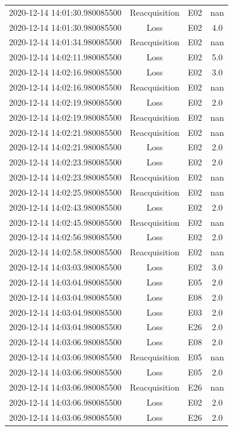 \begin{enumerate}
\begin{longtabu}{cccc}
2020{-}12{-}14 14:01:30.980085500&Reacquisition&E02&nan\\%
2020{-}12{-}14 14:01:30.980085500&Loss&E02&4.0\\%
2020{-}12{-}14 14:01:34.980085500&Reacquisition&E02&nan\\%
2020{-}12{-}14 14:02:11.980085500&Loss&E02&5.0\\%
2020{-}12{-}14 14:02:16.980085500&Loss&E02&3.0\\%
2020{-}12{-}14 14:02:16.980085500&Reacquisition&E02&nan\\%
2020{-}12{-}14 14:02:19.980085500&Loss&E02&2.0\\%
2020{-}12{-}14 14:02:19.980085500&Reacquisition&E02&nan\\%
2020{-}12{-}14 14:02:21.980085500&Reacquisition&E02&nan\\%
2020{-}12{-}14 14:02:21.980085500&Loss&E02&2.0\\%
2020{-}12{-}14 14:02:23.980085500&Loss&E02&2.0\\%
2020{-}12{-}14 14:02:23.980085500&Reacquisition&E02&nan\\%
2020{-}12{-}14 14:02:25.980085500&Reacquisition&E02&nan\\%
2020{-}12{-}14 14:02:43.980085500&Loss&E02&2.0\\%
2020{-}12{-}14 14:02:45.980085500&Reacquisition&E02&nan\\%
2020{-}12{-}14 14:02:56.980085500&Loss&E02&2.0\\%
2020{-}12{-}14 14:02:58.980085500&Reacquisition&E02&nan\\%
2020{-}12{-}14 14:03:03.980085500&Loss&E02&3.0\\%
2020{-}12{-}14 14:03:04.980085500&Loss&E05&2.0\\%
2020{-}12{-}14 14:03:04.980085500&Loss&E08&2.0\\%
2020{-}12{-}14 14:03:04.980085500&Loss&E03&2.0\\%
2020{-}12{-}14 14:03:04.980085500&Loss&E26&2.0\\%
2020{-}12{-}14 14:03:06.980085500&Loss&E08&2.0\\%
2020{-}12{-}14 14:03:06.980085500&Reacquisition&E05&nan\\%
2020{-}12{-}14 14:03:06.980085500&Loss&E05&2.0\\%
2020{-}12{-}14 14:03:06.980085500&Reacquisition&E26&nan\\%
2020{-}12{-}14 14:03:06.980085500&Loss&E02&2.0\\%
2020{-}12{-}14 14:03:06.980085500&Loss&E26&2.0\\%

\end{longtabu}
\end{enumerate}
